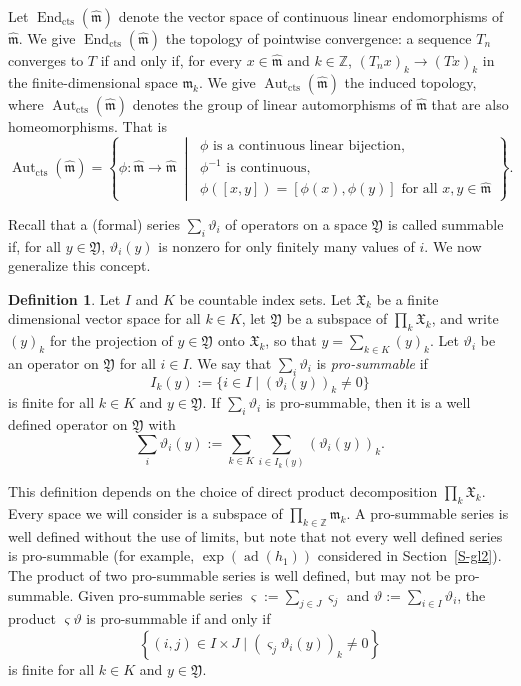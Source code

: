 \documentclass[11pt,letterpaper]{amsart}
\newcounter{thecounter}
\numberwithin{thecounter}{section}
\theoremstyle{definition}
\newtheorem{defn}[thecounter]{Definition}
\DeclareMathOperator{\Aut}{Aut}
\DeclareMathOperator{\End}{End}
\DeclareMathOperator{\ad}{ad}
\newcommand{\Z}{{\mathbb Z}}
\begin{document}
Let
\(\End_{\mathrm{cts}}(\widehat{\mathfrak m})\) denote the vector space of
continuous linear endomorphisms of \(\widehat{\mathfrak m}\). We give
\(\End_{\mathrm{cts}}(\widehat{\mathfrak m})\) the topology of pointwise
convergence: a sequence \(T_n\) converges to \(T\) if and only if, for every
\(x\in \widehat{\mathfrak m}\) and \(k\in\mathbb Z\),
\(
(T_nx)_k\longrightarrow (Tx)_k
\)
in the finite-dimensional space \(\mathfrak m_k\). We give
\(\Aut_{\mathrm{cts}}(\widehat{\mathfrak m})\) the induced topology, where
\(\Aut_{\mathrm{cts}}(\widehat{\mathfrak m})\) denotes the group of 
linear automorphisms of \(\widehat{\mathfrak m}\) that are also homeomorphisms. That is
\[
\Aut_{\mathrm{cts}}(\widehat{\mathfrak m})
=
\left\{
\phi:\widehat{\mathfrak m}\to \widehat{\mathfrak m}
\ \middle|\
\begin{array}{l}
\phi \text{ is a continuous linear bijection},\\[2pt]
\phi^{-1} \text{ is continuous},\\[2pt]
\phi([x,y])=[\phi(x),\phi(y)]
\text{ for all } x,y\in \widehat{\mathfrak m}
\end{array}
\right\}.
\]


Recall that a (formal) series  $\sum_i \vartheta_i$ of operators on a space $\mathfrak{Y}$ is called summable \cite{LL} if, for all $y\in\mathfrak{Y}$,  $\vartheta_i(y)$ is nonzero for only finitely many values of $i$.
We now generalize this concept.
\begin{defn}
Let $I$ and $K$ be countable index sets.
Let $\mathfrak{X}_k$ be a finite dimensional vector space for all $k\in K$, let $\mathfrak Y$ be a subspace of $\prod_k \mathfrak{X}_k$, and write $(y)_k$ for the projection of $y\in\mathfrak Y$ onto $\mathfrak{X}_k$, so that $y=\sum_{k\in K} (y)_k$.
Let $\vartheta_i$ be an operator on $\mathfrak Y$ for all $i\in I$.
We say that $\sum_i \vartheta_i$ is \emph{pro-summable} if $$I_k(y):= \{i\in I\mid \left(\vartheta_i(y) \right)_k\ne 0\}$$
is finite for all $k\in K$ and $y\in \mathfrak{Y}$.
If $\sum_i \vartheta_i$ is pro-summable, then it is a well defined operator on $\mathfrak{Y}$ with
$$ \sum_i \vartheta_i(y) := \sum_{k\in K} \sum_{i\in I_k(y)} \left(\vartheta_i (y) \right)_k.$$
\end{defn}


This definition depends on the choice of direct product decomposition $\prod_{k} \mathfrak{X}_k$. 
Every space we will consider is a subspace of $\prod_{k\in\Z} \mathfrak{m}_k$.
A pro-summable series is well defined without the use of limits, but note that not every well defined series is pro-summable (for example, $\exp\left(\ad\left(h_{1}\right) \right)$ considered in Section~\ref{S-gl2}).
The product of two pro-summable series is well defined, but may not be pro-summable.
Given pro-summable series $\varsigma:= \sum_{j\in J} \varsigma_j$ and $\vartheta:= \sum_{i\in I} \vartheta_i$, the product $\varsigma\vartheta$  is pro-summable if and only if
$$ \left\{(i,j) \in I\times J \mid (\varsigma_j\vartheta_i(y))_k\ne 0 \right\}$$
 is finite for all $k\in K$ and $y\in\mathfrak{Y}$.
\end{document}
